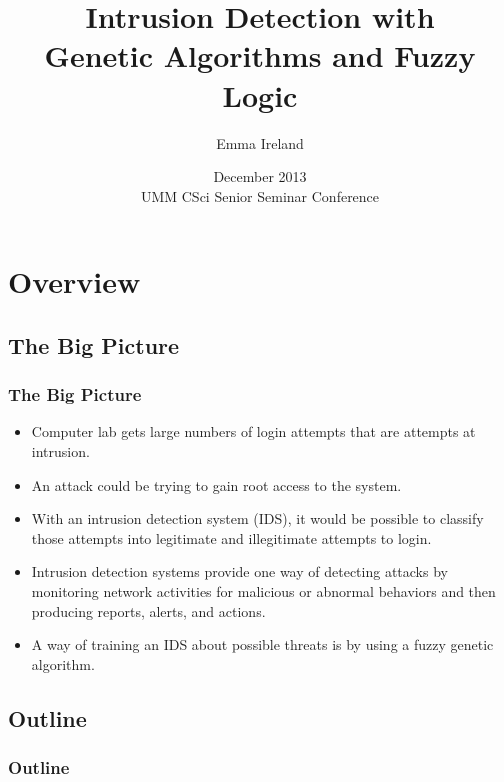 \documentclass{beamer}
\title[Intrusion Detection]{Intrusion Detection with \\ Genetic Algorithms and Fuzzy Logic}
\author[Ireland]{Emma Ireland}
\institute[U of Minn, Morris]
{
  Division of Science and Mathematics \\
  University of Minnesota, Morris \\
  Morris, Minnesota, USA
}
\date[December 2013] %
{December 2013 \\ UMM CSci Senior Seminar Conference}
\begin{document}
\begin{frame}
  \titlepage
\end{frame}


\section*{Overview}

\subsection*{The Big Picture}

\begin{frame}
  \frametitle{The Big Picture}
  \begin{itemize}
  	\item Computer lab gets large numbers of login attempts that are attempts at intrusion.
	\item An attack could be trying to gain root access to the system.
	\item With an intrusion detection system (IDS), it would be possible to classify those attempts into legitimate and illegitimate attempts to login.
	\item Intrusion detection systems provide one way of detecting attacks by monitoring network activities for malicious or abnormal behaviors and then producing reports, alerts, and actions.
	\item A way of training an IDS about possible threats is by using a fuzzy genetic algorithm.
  \end{itemize}
\end{frame}

\subsection*{Outline}

\begin{frame}
  \frametitle{Outline}
  \tableofcontents[hideallsubsections]
\end{frame}
\end{document}
